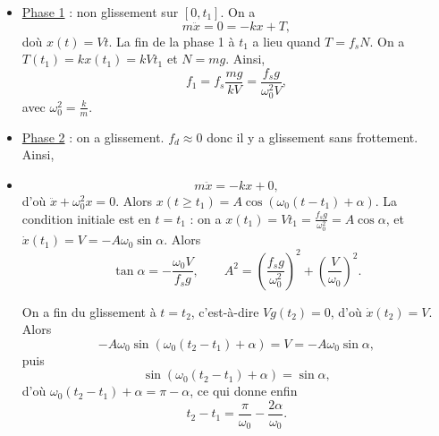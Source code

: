         \begin{itemize}
            \item \underline{Phase 1} : non glissement sur $[0,t_1]$. On a 
            \begin{equation*}
                m\ddot{x}=0=-kx+T,
            \end{equation*}
            doù $x(t)=Vt$. La fin de la phase 1 à $t_1$ a lieu quand $T=f_s N$. On a $T(t_1)=kx(t_1)=kVt_1$ et $N=mg$. Ainsi,
            \begin{equation*}
                f_1=f_s\frac{mg}{kV}=\frac{f_s g}{\omega_{0}^{2}V},
            \end{equation*}
            avec $\omega_{0}^{2}=\frac{k}{m}$.

            \item \underline{Phase 2} : on a glissement. $f_d\approx0$ donc il y a glissement sans frottement. Ainsi,
            \item \begin{equation*}
                m\ddot{x}=-kx+0,
            \end{equation*}
            d'où $\ddot{x}+\omega_{0}^{2}x=0$. Alors $x(t\geqslant t_1)=A\cos\left(\omega_0(t-t_1)+\alpha\right)$. La condition initiale est en $t=t_1$ : on a $x(t_1)=Vt_1=\frac{f_s g}{\omega_{0}^{2}}=A\cos\alpha$, et $\dot{x}(t_1)=V=-A\omega_0\sin\alpha$. Alors
            \begin{equation*}
                \tan\alpha=-\frac{\omega_0 V}{f_s g},\qquad A^{2}=\left(\frac{f_s g}{\omega_{0}^{2}}\right)^{2}+\left(\frac{V}{\omega_0}\right)^{2}.
            \end{equation*}

            On a fin du glissement à $t=t_2$, c'est-à-dire $Vg(t_2)=0$, d'où $\dot{x}(t_2)=V$. Alors
            \begin{equation*}
                -A\omega_0\sin\left(\omega_0(t_2-t_1)+\alpha\right)=V=-A\omega_0\sin\alpha,
            \end{equation*}
            puis
            \begin{equation*}
                \sin\left(\omega_0(t_2-t_1)+\alpha\right)=\sin\alpha,
            \end{equation*}
            d'où $\omega_0(t_2-t_1)+\alpha=\pi-\alpha$, ce qui donne enfin
            \begin{equation*}
                t_2-t_1=\frac{\pi}{\omega_0}-\frac{2\alpha}{\omega_0}.
            \end{equation*}


\end{itemize}
